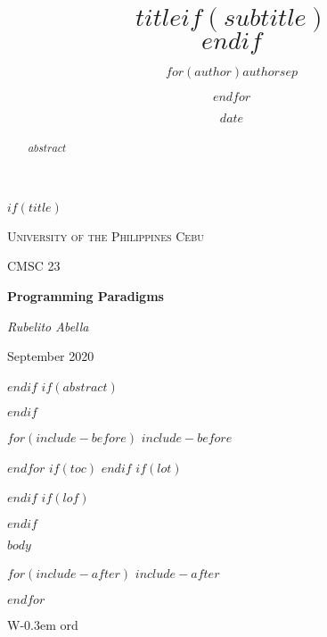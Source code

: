 \documentclass[$if(fontsize)$$fontsize$,$endif$$if(lang)$$lang$,$endif$$if(papersize)$$papersize$,$endif$$for(classoption)$$classoption$$sep$,$endfor$]{$documentclass$}
\title{$title$$if(subtitle)$\\\vspace{0.5em}{\large $subtitle$}$endif$}
\author{$for(author)$$author$$sep$ \and $endfor$}
\date{$date$}
\begin{document}
$if(title)$
\begin{titlepage}
	\centering
	{\scshape\LARGE University of the Philippines Cebu \par}
	\vspace{1cm}
	{\scshape\Large CMSC 23\par}
	\vspace{1.5cm}
	{\huge\bfseries Programming Paradigms\par}
	\vspace{2cm}
	{\Large\itshape Rubelito Abella\par}
	\vfill

	\vfill

	{\large September 2020\par}
\end{titlepage}
$endif$
$if(abstract)$
\begin{abstract}
$abstract$
\end{abstract}
$endif$

$for(include-before)$
$include-before$

$endfor$
$if(toc)$
{
\hypersetup{linkcolor=black}
\setcounter{tocdepth}{$toc-depth$}
\tableofcontents
}
$endif$
$if(lot)$
\listoftables
$endif$
$if(lof)$
\listoffigures
$endif$

$body$


\printbibliography

$for(include-after)$
$include-after$

$endfor$

W\kern-0.3em ord
\end{document}
